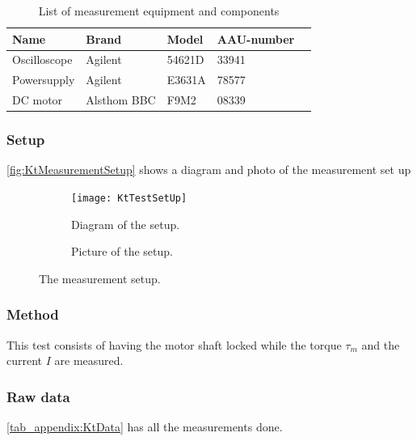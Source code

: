 \begin{table}[htbp]
	\centering
	\caption{List of measurement equipment and components}\label{tab_appendix:KtSetUp}
	
	\begin{tabularx}{\textwidth}{lXXXX}
		Name 				& Brand	& Model & AAU-number									\\ \toprule \rowcolor{lightGrey}
		Oscilloscope	& Agilent & 54621D & 33941 	\\
		Powersupply	& Agilent & E3631A & 78577\\ \rowcolor{lightGrey}
		DC motor & Alsthom BBC & F9M2& 08339
	\end{tabularx}
\end{table}

\subsubsection*{Setup}
\autoref{fig:KtMeasurementSetup} shows a diagram and photo of the measurement set up
\begin{figure}[htbp]
	\centering
	\begin{subfigure}{0.50\textwidth}
			\texttt{[image: KtTestSetUp]}
		\caption{Diagram of the setup.} \label{fig:KtMeasurementDiagram}
	\end{subfigure}
	\begin{subfigure}{0.40\textwidth}
		\caption{Picture of the setup.} \label{fig:KtMeasurementPictures}
	\end{subfigure}
	\caption{The measurement setup.} \label{fig:KtMeasurementSetup}   
\end{figure}

\subsubsection*{Method}
This test consists of having the motor shaft locked while the torque $\tau_m$ and the current $I$ are measured.
\newpage


\subsubsection*{Raw data}
\autoref{tab_appendix:KtData} has all the measurements done.

